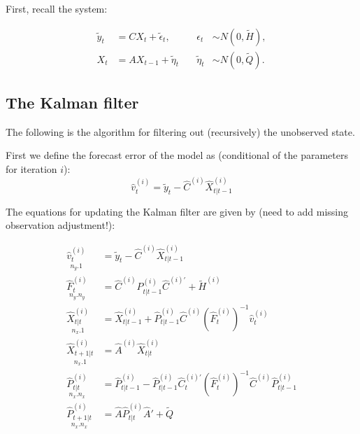 \documentclass[12pt]{article}
\begin{document}
\begin{appendices}
First, recall the system:

\begin{equation}
\begin{aligned}
\widetilde{y}_{t} 			&= C X_{t} + \tilde{\epsilon}_{t}, 	\quad &\epsilon_{t} 	        &\sim N(0, \widetilde{H} ),\\
X_{t} 			&= A X_{t-1} + \tilde{\eta}_{t}		\quad &\tilde{\eta}_{t} 		&\sim N(0, \widetilde{Q}).
\end{aligned}
\end{equation}


\subsection{The Kalman filter}

The following is the algorithm for filtering out (recursively) the unobserved state.


First we define the forecast error of the model as (conditional of the parameters for iteration $i$):
\begin{equation}
\widehat{v}_{t}^{(i)} = \widetilde{y}_{t} - \widehat{C}^{(i)} \widehat{X}_{t|t-1}^{(i)}
\end{equation}

The equations for updating the Kalman filter are given by (need to add missing observation adjustment!):

\begin{equation*}
\begin{aligned}
\underset{n_{y}.1}{\widehat{v}_{t}^{(i)}} 			&= \widetilde{y}_{t} - \widehat{C}^{(i)} \widehat{X}_{t|t-1}^{(i)}\\
\underset{n_{y}.n_{y}}{\widehat{F}_{t}^{(i)}} 		&= \widehat{C}^{(i)} P_{t|t-1}^{(i)} \widehat{C}^{(i)'} + \widetilde{H}^{(i)} \\
\underset{n_{x}.1}{\widehat{X}_{t|t}^{(i)}} 		&= \widehat{X}_{t|t-1}^{(i)} + \widehat{P}_{t|t-1}^{(i)} \widehat{C}^{(i)} \left(\widehat{F}_{t}^{(i)}\right)^{-1} \widehat{v}_{t}^{(i)}\\	
\underset{n_{x}.1}{\widehat{X}_{t+1|t}^{(i)}} 		&= \widehat{A}^{(i)} \widehat{X}_{t|t}^{(i)}\\
\underset{n_{x}.n_{x}}{\widehat{P}_{t|t}^{(i)}}		&= \widehat{P}_{t|t-1}^{(i)} - \widehat{P}_{t|t-1}^{(i)} \widehat{C}_{t}^{(i)'} \left(\widehat{F}_{t}^{(i)}\right)^{-1} \widehat{C}^{(i)} \widehat{P}_{t|t-1}^{(i)}\\
\underset{n_{x}.n_{x}}{\widehat{P}_{t+1|t}^{(i)}}	&= \widehat{A} \widehat{P}_{t|t}^{(i)} \widehat{A}' + \widetilde{Q}
\end{aligned}
\end{equation*}




\end{appendices}
\end{document}
